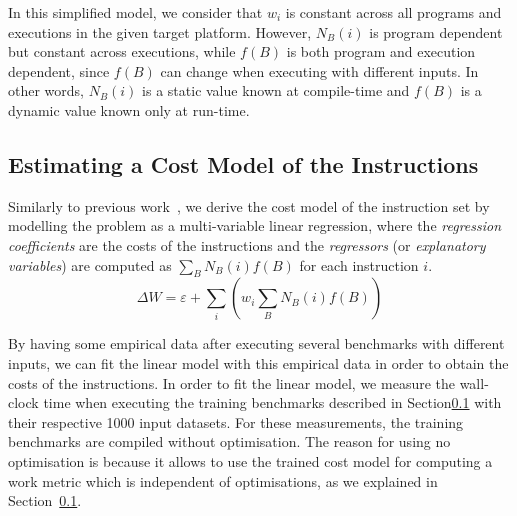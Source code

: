In this simplified model, we consider that $w_i$ is constant across all programs and executions in the given target platform.
However, $N_B(i)$ is program dependent but constant across executions, while $f(B)$ is both program and execution dependent, since $f(B)$ can change when executing with different inputs.
In other words, $N_B(i)$ is a static value known at compile-time and $f(B)$ is a dynamic value known only at run-time.

%


\subsection{Estimating a Cost Model of the Instructions}

Similarly to previous work~\citep{giusto01,powell09,brandolese11}, we derive the cost model of the instruction set by modelling the problem as a multi-variable linear regression, where the \textit{regression coefficients} are the costs of the instructions and the \textit{regressors} (or \textit{explanatory variables}) are computed as $\sum_B N_B(i)f(B)$ for each instruction $i$.
\[
\Delta W = \varepsilon + \sum_{i} \left(w_i \sum_{B} N_B(i)f(B)\right)
\]

By having some empirical data after executing several benchmarks with different inputs, we can fit the linear model with this empirical data in order to obtain the costs of the instructions.
In order to fit the linear model, we measure the wall-clock time when executing the training benchmarks described in Section\ref{} with their respective 1000 input datasets.
For these measurements, the training benchmarks are compiled without optimisation.
The reason for using no optimisation is because it allows to use the trained cost model for computing a work metric which is independent of optimisations, as we explained in Section~\ref{}.


